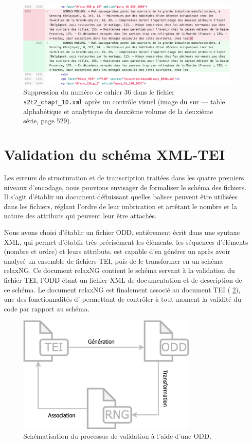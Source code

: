 \begin{figure}
    \centering
    \includegraphics[width=16cm]{img/suppr_num _cahier_visuel.png}
    \caption[Suppression d'un numéro de cahier (2)]{Suppression du numéro de cahier 36 dans le fichier  \texttt{s2t2\_chapt\_10.xml} après un contrôle visuel (image du \commit{} sur \gitlab{} --- table alphabétique et analytique du deuxième volume de la deuxième série, page 529).}
    \label{fig:suppnumcahiervisu}
\end{figure}


\section{Validation du schéma XML-TEI}

Les erreurs de structuration et de transcription traitées dans les quatre premiers niveaux d'encodage, nous pouvions envisager de formaliser le schéma des fichiers. Il s'agit d'établir un document définissant quelles balises peuvent être utilisées dans les fichiers, réglant l'ordre de leur imbrication et arrêtant le nombre et la nature des attributs qui peuvent leur être attachés.

Nous avons choisi d'établir un fichier ODD, entièrement écrit dans une syntaxe XML, qui permet d'établir très précisément les éléments, les séquences d'éléments (nombre et ordre) et leurs attributs. \oxygen{} est capable d'en générer un après avoir analysé un ensemble de fichiers TEI, puis de le transformer en un schéma relaxNG. Ce document relaxNG contient le schéma servant à la validation du fichier TEI, l'ODD étant un fichier XML de documentation et de description de ce schéma. Le document relaxNG est finalement associé au document TEI (\fig{} \ref{fig:tei-odd-rng}), une des fonctionnalités d'\oxygen{} permettant de contrôler à tout moment la validité du code par rapport au schéma.

\begin{figure}[ht]
    \centering
    \includegraphics[width=9cm]{img/tei-odd-rng.png}
    \caption{Schématisation du processus de validation à l'aide d'une ODD.}
    \label{fig:tei-odd-rng}
\end{figure}

